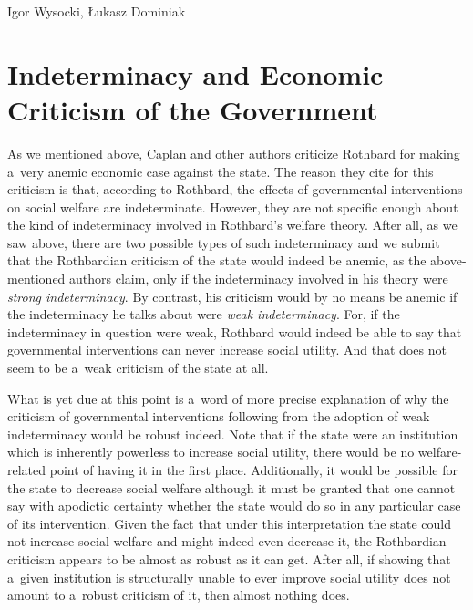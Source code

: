 \begin{artengenv}{Igor Wysocki, Łukasz Dominiak}
\section{Indeterminacy and Economic Criticism of the Government}

As we mentioned above, Caplan and other authors criticize Rothbard for making a~very anemic economic case against the state. The reason they cite for this criticism is that, according to Rothbard, the effects of governmental interventions on social welfare are indeterminate. However, they are not specific enough about the kind of indeterminacy involved in Rothbard's welfare theory. After all, as we saw above, there are two possible types of such indeterminacy and we submit that the Rothbardian criticism of the state would indeed be anemic, as the above-mentioned authors claim, only if the indeterminacy involved in his theory were \textit{strong indeterminacy}. By contrast, his criticism would by no means be anemic if the indeterminacy he talks about were \textit{weak indeterminacy}. For, if the indeterminacy in question were weak, Rothbard would indeed be able to say that governmental interventions can never increase social utility. And that does not seem to be a~weak criticism of the state at all.



What is yet due at this point is a~word of more precise explanation of why the criticism of governmental interventions following from the adoption of weak indeterminacy would be robust indeed. Note that if the state were an institution which is inherently powerless to increase social utility, there would be no welfare-related point of having it in the first place. Additionally, it would be possible for the state to decrease social welfare although it must be granted that one cannot say with apodictic certainty whether the state would do so in any particular case of its intervention. Given the fact that under this interpretation the state could not increase social welfare and might indeed even decrease it, the Rothbardian criticism appears to be almost as robust as it can get. After all, if showing that a~given institution is structurally unable to ever improve social utility does not amount to a~robust criticism of it, then almost nothing does.




\end{artengenv}
